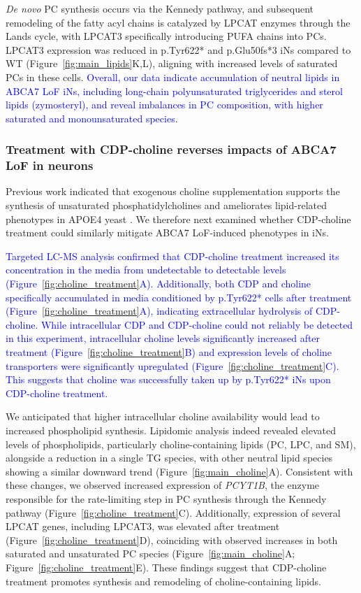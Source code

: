 \textit{De novo} PC synthesis occurs via the Kennedy pathway, and subsequent remodeling of the fatty acyl chains is catalyzed by LPCAT enzymes through the Lands cycle, with LPCAT3 specifically introducing PUFA chains into PCs\cite{Boumann2003-ew,Wang2019-om,Zhao2008-pq}. LPCAT3 expression was reduced in p.Tyr622* and p.Glu50fs*3 iNs compared to WT (Figure~\ref{fig:main_lipids}K,L), aligning with increased levels of saturated PCs in these cells. \newcommand{\quoteH}{\textcolor{blue}{Overall, our data indicate accumulation of neutral lipids in ABCA7 LoF iNs, including long-chain polyunsaturated triglycerides and sterol lipids (zymosteryl), and reveal imbalances in PC composition, with higher saturated and monounsaturated species.\label{quoteH-label}}}
\quoteH

\subsubsection{Treatment with CDP-choline reverses impacts of ABCA7 LoF in neurons}
Previous work indicated that exogenous choline supplementation supports the synthesis of unsaturated phosphatidylcholines and ameliorates lipid-related phenotypes in APOE4 yeast \cite{Boumann2006-nz,Sienski2021-zt}. We therefore next examined whether CDP-choline treatment could similarly mitigate ABCA7 LoF-induced phenotypes in iNs.

\newcommand{\quoteD}{\textcolor{blue}{Targeted LC-MS analysis confirmed that CDP-choline treatment increased its concentration in the media from undetectable to detectable levels (Figure~\ref{fig:choline_treatment}A). Additionally, both CDP and choline specifically accumulated in media conditioned by p.Tyr622* cells after treatment (Figure~\ref{fig:choline_treatment}A), indicating extracellular hydrolysis of CDP-choline. While intracellular CDP and CDP-choline could  not reliably be detected in this experiment, intracellular choline levels significantly increased after treatment (Figure~\ref{fig:choline_treatment}B) and expression levels of choline transporters were significantly upregulated (Figure~\ref{fig:choline_treatment}C). This suggests that choline was successfully taken up by p.Tyr622* iNs upon CDP-choline treatment.\label{quoteD-label}}} 
\quoteD

We anticipated that higher intracellular choline availability would lead to increased phospholipid synthesis. Lipidomic analysis indeed revealed elevated levels of phospholipids, particularly choline-containing lipids (PC, LPC, and SM), alongside a reduction in a single TG species, with other neutral lipid species showing a similar downward trend (Figure~\ref{fig:main_choline}A). Consistent with these changes, we observed increased expression of \textit{PCYT1B}, the enzyme responsible for the rate-limiting step in PC synthesis through the Kennedy pathway (Figure~\ref{fig:choline_treatment}C). Additionally, expression of several LPCAT genes, including LPCAT3, was elevated after treatment (Figure~\ref{fig:choline_treatment}D), coinciding with observed increases in both saturated and unsaturated PC species (Figure~\ref{fig:main_choline}A; Figure~\ref{fig:choline_treatment}E). These findings suggest that CDP-choline treatment promotes synthesis and remodeling of choline-containing lipids.

